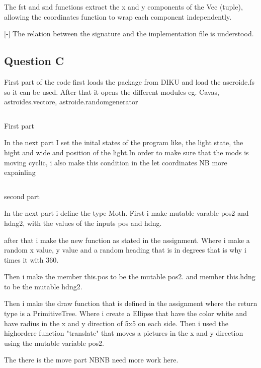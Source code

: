 \documentclass{article}
\begin{document}
The fst and snd functions extract the x and y components of the Vec (tuple), allowing the coordinates function to wrap each component independently.




[-] The relation between the signature and the implementation file is understood.


\subsection{Question C}

First part of the code first loads the package from DIKU and load the aseroide.fs so it can be used. After that it opens the different modules eg. Cavas, astroides.vectore, astroide.randomgenerator


\label{app:appA}
\begin{listing}[!ht]
\inputminted{fsharp}{Code/firstpart.tex}
\caption{First part}
\label{app:vec_example}
\end{listing}



In the next part I set the inital states of the program like, the light state, the hight and wide and position of the light.In order to make sure that the mods is moving cyclic, i also make this condition in the let coordinates NB more expainling  


\label{app:appA}
\begin{listing}[!ht]
\inputminted{fsharp}{Code/secondpart.tex}
\caption{second part}
\label{app:vec_example}
\end{listing}

In the next part i define the type Moth. First i make mutable varable pos2 and hdng2, with the values of the inputs pos and hdng. 

after that i make the new function as stated in the assignment. Where i make a random x value, y value and a random heading that is in degrees that is why i times it with 360. 

Then i make the member this.pos to be the mutable pos2. and member this.hdng to be the mutable hdng2.

Then i make the draw function that is defined in the assignment where the return type is a PrimitiveTree. Where i create a Ellipse that have the color white and have radius in the x and y direction of 5x5 on each side. Then i used the highordere function "translate" that moves a pictures in the x and y direction using the mutable variable pos2.


The there is the move part NBNB need more work here.
\end{document}
